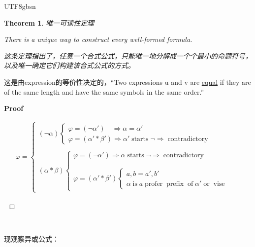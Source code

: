 \documentclass{article}
\newtheorem{theorem}{Theorem}
\begin{document}
\begin{CJK*}{UTF8}{gbsn}
\begin{theorem}
  唯一可读性定理
  
  There is a unique way to construct every well-formed formula.
  
  这条定理指出了，任意一个合式公式，只能唯一地分解成一个个最小的命题符号，以及唯一确定它们构建该合式公式的方式。
\end{theorem}

这是由expression的等价性决定的，``Two expressions u and v are
{\underline{equal}} if they are of the same length and have the same symbols
in the same order.''

\noindent\textbf{Proof\ }\

\begin{align}
  \varphi = \left\{\begin{array}{l}
    (\neg \alpha)  \left\{\begin{array}{l}
      \varphi = (\neg \alpha') \quad \Rightarrow \alpha = \alpha'\\
      \varphi = (\alpha' \ast \beta') \Rightarrow \alpha'
      \ensuremath{\operatorname{starts}} \neg \Rightarrow
      \ensuremath{\operatorname{contradictory}}
    \end{array}\right.\\
    \\
    (\alpha \ast \beta) \left\{\begin{array}{l}
      \varphi = (\neg \alpha') \Rightarrow \alpha
      \ensuremath{\operatorname{starts}} \neg \Rightarrow
      \ensuremath{\operatorname{contradictory}}\\
      \\
      \\
      \varphi = (\alpha' \ast \beta') \left\{\begin{array}{l}
        a, b = a', b'\\
        \alpha
        \ensuremath{\operatorname{is}}a\ensuremath{\operatorname{profer}}\ensuremath{\operatorname{prefix}}\ensuremath{\operatorname{of}}
        \alpha' \ensuremath{\operatorname{or}}\ensuremath{\operatorname{vise}}
      \end{array}\right.
    \end{array}\right.
  \end{array}\right. &  \nonumber
\end{align}

\ \hspace*{\fill}$\Box$\medskip

\

现观察异或公式：


\end{CJK*}
\end{document}
